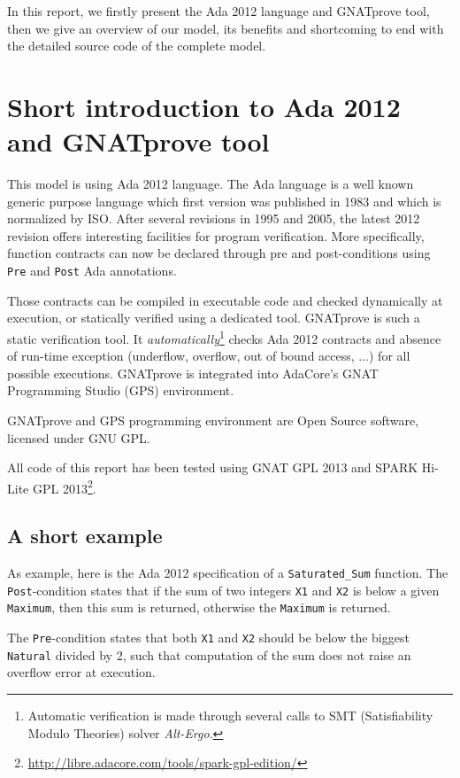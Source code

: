 \documentclass{template/openetcs_report}
\newcommand{\Ada}[1]{\lstinline[language=Ada,basicstyle={\sffamily},framesep=0pt]{#1}}
\begin{document}
In this report, we firstly present the Ada 2012 language and GNATprove
tool, then we give an overview of our model, its benefits and
shortcoming to end with the detailed source code of the complete
model.

\chapter{Short introduction to Ada 2012 and GNATprove tool}

This model is using Ada 2012 language\cite{arm2012}. The Ada language
is a well known generic purpose language which first version was
published in 1983 and which is normalized by ISO. After several
revisions in 1995 and 2005, the latest 2012 revision offers
interesting facilities for program verification. More specifically,
function contracts can now be declared through pre and post-conditions
using \Ada{Pre} and \Ada{Post} Ada annotations.

Those contracts can be compiled in executable code and checked
dynamically at execution, or statically verified using a dedicated
tool. GNATprove is such a static verification tool. It
\emph{automatically}\footnote{Automatic verification is made through
  several calls to SMT (Satisfiability Modulo Theories) solver
  \emph{Alt-Ergo}.} checks Ada 2012 contracts and absence of run-time
exception (underflow, overflow, out of bound access, ...) for all
possible executions. GNATprove is integrated into AdaCore's GNAT
Programming Studio (GPS) environment.

GNATprove and GPS programming environment are Open Source software,
licensed under GNU GPL.

All code of this report has been tested using GNAT GPL 2013 and SPARK
Hi-Lite GPL
2013\footnote{\url{http://libre.adacore.com/tools/spark-gpl-edition/}}.

\section{A short example}

As example, here is the Ada 2012 specification of a
\Ada{Saturated_Sum} function. The \Ada{Post}-condition states that if
the sum of two integers \Ada{X1} and \Ada{X2} is below a given
\Ada{Maximum}, then this sum is returned, otherwise the \Ada{Maximum}
is returned.

The \Ada{Pre}-condition states that both \Ada{X1} and \Ada{X2} should
be below the biggest \Ada{Natural} divided by 2, such that computation
of the sum does not raise an overflow error at execution.
\end{document}
